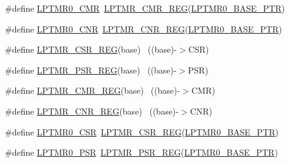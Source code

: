 \begin{DoxyCompactItemize}
\item 
\#define \hyperlink{group___l_p_t_m_r___register___accessor___macros_gac109508795b1b22820940313ddb4c620}{L\+P\+T\+M\+R0\+\_\+\+C\+MR}~\hyperlink{group___l_p_t_m_r___register___accessor___macros_ga7a7ca80913d5f4e2ceed4be05272267a}{L\+P\+T\+M\+R\+\_\+\+C\+M\+R\+\_\+\+R\+EG}(\hyperlink{group___l_p_t_m_r___peripheral_ga90a9194151ad11b422bcab162e797eda}{L\+P\+T\+M\+R0\+\_\+\+B\+A\+S\+E\+\_\+\+P\+TR})
\item 
\#define \hyperlink{group___l_p_t_m_r___register___accessor___macros_gada9bf6b3d564321571ac27faa4d263ad}{L\+P\+T\+M\+R0\+\_\+\+C\+NR}~\hyperlink{group___l_p_t_m_r___register___accessor___macros_gac2f4b2b992990404896f3b23f4d666cb}{L\+P\+T\+M\+R\+\_\+\+C\+N\+R\+\_\+\+R\+EG}(\hyperlink{group___l_p_t_m_r___peripheral_ga90a9194151ad11b422bcab162e797eda}{L\+P\+T\+M\+R0\+\_\+\+B\+A\+S\+E\+\_\+\+P\+TR})
\item 
\#define \hyperlink{group___l_p_t_m_r___register___accessor___macros_ga10321db77b5ec14e5985fe94395f437d}{L\+P\+T\+M\+R\+\_\+\+C\+S\+R\+\_\+\+R\+EG}(base)                                        ~((base)-\/$>$C\+SR)
\item 
\#define \hyperlink{group___l_p_t_m_r___register___accessor___macros_gaecd9b9ac7bad67f904628f9ecc653285}{L\+P\+T\+M\+R\+\_\+\+P\+S\+R\+\_\+\+R\+EG}(base)                                        ~((base)-\/$>$P\+SR)
\item 
\#define \hyperlink{group___l_p_t_m_r___register___accessor___macros_ga7a7ca80913d5f4e2ceed4be05272267a}{L\+P\+T\+M\+R\+\_\+\+C\+M\+R\+\_\+\+R\+EG}(base)                                        ~((base)-\/$>$C\+MR)
\item 
\#define \hyperlink{group___l_p_t_m_r___register___accessor___macros_gac2f4b2b992990404896f3b23f4d666cb}{L\+P\+T\+M\+R\+\_\+\+C\+N\+R\+\_\+\+R\+EG}(base)                                        ~((base)-\/$>$C\+NR)
\item 
\#define \hyperlink{group___l_p_t_m_r___register___accessor___macros_ga92117617fde3b4150e2c04e6f828f565}{L\+P\+T\+M\+R0\+\_\+\+C\+SR}~\hyperlink{group___l_p_t_m_r___register___accessor___macros_ga10321db77b5ec14e5985fe94395f437d}{L\+P\+T\+M\+R\+\_\+\+C\+S\+R\+\_\+\+R\+EG}(\hyperlink{group___l_p_t_m_r___peripheral_ga90a9194151ad11b422bcab162e797eda}{L\+P\+T\+M\+R0\+\_\+\+B\+A\+S\+E\+\_\+\+P\+TR})
\item 
\#define \hyperlink{group___l_p_t_m_r___register___accessor___macros_ga69b40af8e215d5b29b3f9677d7f8d632}{L\+P\+T\+M\+R0\+\_\+\+P\+SR}~\hyperlink{group___l_p_t_m_r___register___accessor___macros_gaecd9b9ac7bad67f904628f9ecc653285}{L\+P\+T\+M\+R\+\_\+\+P\+S\+R\+\_\+\+R\+EG}(\hyperlink{group___l_p_t_m_r___peripheral_ga90a9194151ad11b422bcab162e797eda}{L\+P\+T\+M\+R0\+\_\+\+B\+A\+S\+E\+\_\+\+P\+TR})

\end{DoxyCompactItemize}
